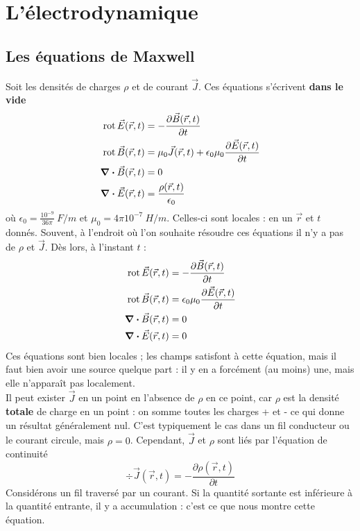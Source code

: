 \chapter{L'électrodynamique}
\section{Les équations de Maxwell}
Soit les densités de charges $\rho$ et de courant $\vec{J}$. Ces équations 
s'écrivent \textbf{dans le vide}
\begin{equation}
\begin{split}
\text{rot}\, \vec E(\vec r,t) &= -\frac{\partial\vec{B}(\vec{r},t)}{\partial t}\\
\text{rot}\, \vec B(\vec r,t) &= \mu_0\vec{J}(\vec r,t) + \epsilon_0\mu_0\frac{\partial \vec E
(\vec r,t)}{\partial t}\\
\div \vec{B}(\vec r,t) &= 0\\
\div \vec{E}(\vec r,t) &= \frac{\rho(\vec r,t)}{\epsilon_0}
\end{split}
\end{equation}
où $\epsilon_0 = \frac{10^{-9}}{36\pi}\ F/m$ et $\mu_0 = 4\pi 10^{-7}\ H/m$.
Celles-ci sont locales : en un $\vec{r}$ et $t$ donnés. Souvent, à l'endroit où l'on 
souhaite résoudre ces équations il n'y a pas de $\rho$ et $\vec{J}$. Dès lors, à 
l'instant $t$ :
\begin{equation}
\begin{split}
\text{rot}\, \vec E(\vec r,t) &= -\frac{\partial\vec{B}(\vec{r},t)}{\partial t}\\
\text{rot}\, \vec B(\vec r,t) &= \epsilon_0\mu_0\frac{\partial \vec E
(\vec r,t)}{\partial t}\\
\div \vec{B}(\vec r,t) &= 0\\
\div \vec{E}(\vec r,t) &= 0
\end{split}
\end{equation}
Ces équations sont bien locales ; les champs satisfont à cette équation, mais il faut bien avoir 
une source quelque part : il y en a forcément (au moins) une, mais elle n'apparaît 
pas localement.\\

\danger Il peut exister $\vec J$ en un point en l'absence de $\rho$ en ce point, car $\rho$ est 
la densité \textbf{totale} de charge en un point : on somme toutes les charges + et - ce qui 
donne un résultat généralement nul. C'est typiquement le cas dans un fil conducteur ou le 
courant circule, mais $\rho = 0$. Cependant, $\vec{J}$ et $\rho$ sont liés par l'équation de 
continuité
\begin{equation}
\div \vec{J}(\vec{r},t) = -\dfrac{\partial\rho(\vec{r},t)}{\partial t}
\end{equation}
Considérons un fil traversé par un courant. Si la quantité sortante est inférieure à la 
quantité entrante, il y a accumulation : c'est ce que nous montre cette équation.\\

